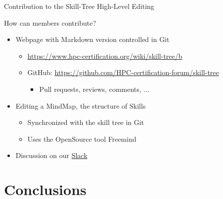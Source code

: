 \documentclass[compress,aspectratio=169]{beamer}
\begin{document}
\begin{frame}{Contribution to the Skill-Tree High-Level Editing}

  \begin{block}{How can members contribute?}
  \begin{itemize}
    \item Webpage with Markdown version controlled in Git
      \begin{itemize}
        \item \url{https://www.hpc-certification.org/wiki/skill-tree/b}
        \item GitHub: \url{https://github.com/HPC-certification-forum/skill-tree}
        \begin{itemize}
          \item Pull requests, reviews, comments, ...
        \end{itemize}
      \end{itemize}
    \item Editing a MindMap, the structure of Skills
      \begin{itemize}
        \item Synchronized with the skill tree in Git
        \item Uses the OpenSource tool Freemind
      \end{itemize}
    \item Discussion on our \href{https://join.slack.com/t/hpc-certification/shared_invite/enQtMzUwNzU3NzM2MTkzLTAzZWM3NDg0N2I2ZmQwOWI5ZGUwNjNlNDgzM2RmOTM3ZWRjNjIxYTc5NzUxYTJhNmRlNmM5YmE1NDY3YzkzYzA}{Slack}
  \end{itemize}  
  \end{block}
\end{frame}



\section{Conclusions}
\sectionIntroHidden
\end{document}
